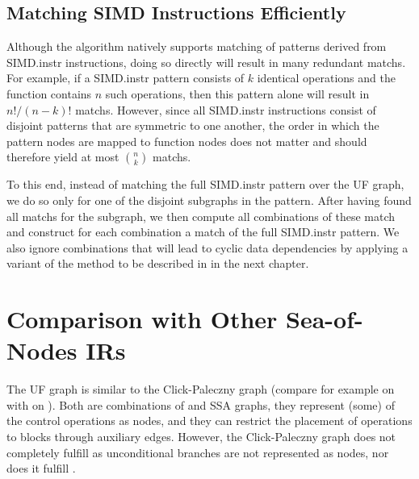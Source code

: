 \subsection{Matching SIMD Instructions Efficiently}

Although the algorithm natively supports matching of \glspl{pattern} derived
from \gls{SIMD.instr} \glspl{instruction}, doing so directly will result in many
redundant \glspl{match}.
%
For example, if a \gls{SIMD.instr} \gls{pattern} consists of $k$ identical
\glspl{operation} and the function contains $n$ such \glspl{operation}, then
this \gls{pattern} alone will result in \mbox{$n! / (n - k)!$} \glspl{match}.
%
However, since all \gls{SIMD.instr} \glspl{instruction} consist of disjoint
\glspl{pattern} that are symmetric to one another, the order in which the
\gls{pattern} \glspl{node} are mapped to \gls{function} \glspl{node} does not
matter and should therefore yield at most $\binom{n}{k}$ \glspl{match}.

To this end, instead of matching the full \gls{SIMD.instr} \gls{pattern} over
the \gls{UF graph}, we do so only for one of the disjoint \glspl{subgraph} in
the \gls{pattern}.
%
After having found all \glspl{match} for the \gls{subgraph}, we then compute all
combinations of these \gls{match} and construct for each combination a
\gls{match} of the full \gls{SIMD.instr} \gls{pattern}.
%
We also ignore combinations that will lead to cyclic data dependencies by
applying a variant of the method to be described in
 in the next chapter.



\section{Comparison with Other Sea-of-Nodes IRs}

The \gls{UF graph} is similar to the \gls{Click-Paleczny graph} (compare for
example  on
 with
 on
).
%
Both are combinations of  and \glspl{SSA graph},
they represent (some) of the control \glspl{operation} as \glspl{node}, and they
can restrict the placement of \glspl{operation} to \glspl{block} through
auxiliary edges.
%
However, the \gls{Click-Paleczny graph} does not completely fulfill
 as unconditional branches are not
represented as \glspl{node}, nor does it fulfill
.


